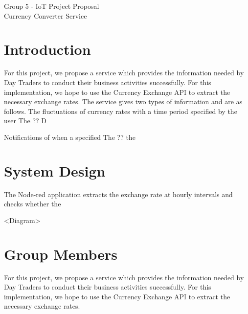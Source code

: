 
\begin{center}
\begin{huge}
Group 5 - IoT Project Proposal\\
Currency Converter Service

\end{huge}

\end{center}



\section{Introduction}

For this project, we propose a service which provides the information needed by Day Traders to conduct their business activities successfully. For this implementation, we hope to use the Currency Exchange API to extract the necessary exchange rates. 
The service gives two types of information and are as follows.
The fluctuations of currency rates with a time period specified by the user\cite{10years}
The ??
D

Notifications of when a specified 
The ??
the

\section{System Design}

The Node-red application extracts the exchange rate at hourly intervals and checks whether the 

<Diagram>


\section{Group Members}

For this project, we propose a service which provides the information needed by Day Traders to conduct their business activities successfully. For this implementation, we hope to use the Currency Exchange API to extract the necessary exchange rates.